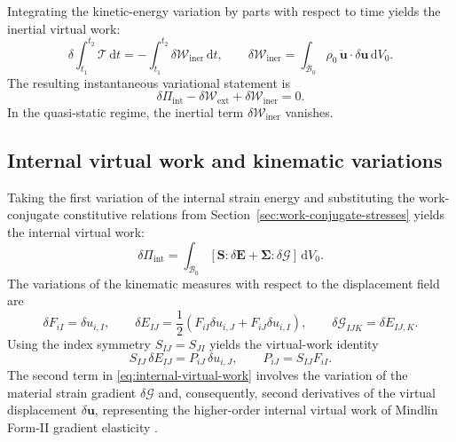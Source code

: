 \documentclass[preprint,12pt]{elsarticle}
\begin{document}
Integrating the kinetic-energy variation by parts with respect to time yields the inertial virtual work:
\begin{equation}
 \delta\int_{t_1}^{t_2}\mathcal{T}\,\mathrm{d}t
 =-\int_{t_1}^{t_2}\delta\mathcal{W}_{\mathrm{iner}}\,\mathrm{d}t,
 \qquad
 \delta\mathcal{W}_{\mathrm{iner}}
 =\int_{\mathcal{B}_0}
 \rho_0\,\ddot{\mathbf{u}}\cdot\delta\mathbf{u}\,\mathrm{d}V_0.
 \label{eq:inertia-virtual-work}
\end{equation}
The resulting instantaneous variational statement is
\begin{equation}
 \delta\Pi_{\mathrm{int}}
 -\delta\mathcal{W}_{\mathrm{ext}}
 +\delta\mathcal{W}_{\mathrm{iner}}=0.
 \label{eq:instantaneous-variational-statement}
\end{equation}
In the quasi-static regime, the inertial term $\delta\mathcal{W}_{\mathrm{iner}}$ vanishes.

\subsection{Internal virtual work and kinematic variations}
\label{sec:internal-virtual-work}

Taking the first variation of the internal strain energy and substituting the work-conjugate constitutive relations from Section~\ref{sec:work-conjugate-stresses} yields the internal virtual work:
\begin{equation}
 \delta\Pi_{\mathrm{int}}
 =\int_{\mathcal{B}_0}
 \left[
 \mathbf{S}:\delta\mathbf{E}
 +\boldsymbol{\Sigma}:\delta\bm{\mathcal{G}}
 \right]\,\mathrm{d}V_0.
 \label{eq:internal-virtual-work}
\end{equation}
The variations of the kinematic measures with respect to the displacement field are
\begin{equation}
 \delta F_{iI}=\delta u_{i,I},
 \qquad
 \delta E_{IJ}
 =\frac{1}{2}\left(F_{iI}\delta u_{i,J}
 +F_{iJ}\delta u_{i,I}\right),
 \qquad
 \delta\mathcal{G}_{IJK}=\delta E_{IJ,K}.
 \label{eq:variation-chain}
\end{equation}
Using the index symmetry $S_{IJ}=S_{JI}$ yields the virtual-work identity
\begin{equation}
 S_{IJ}\,\delta E_{IJ}
 =P_{iJ}\,\delta u_{i,J},
 \qquad
 P_{iJ}=S_{IJ}F_{iI}.
 \label{eq:piola-virtual-work-identity}
\end{equation}
The second term in \eqref{eq:internal-virtual-work} involves the
variation of the material strain gradient $\delta\bm{\mathcal{G}}$ and,
consequently, second derivatives of the virtual displacement
$\delta\mathbf{u}$, representing the higher-order internal virtual work of
Mindlin Form-II gradient elasticity \cite{MindlinEshel1968,Germain1973}.
\end{document}

